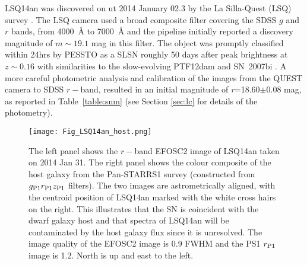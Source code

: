 \documentclass[useAMS,usenatbib]{mn2e}
\def\an{LSQ14an}
\begin{document}
\an\/ was discovered on {\sc ut} 2014 January 02.3 by the La Silla-Quest (LSQ) survey 
\citep{2013PASP..125..683B}. 
The LSQ camera used a broad composite filter covering the SDSS $g$ and $r$ bands,  from 4000~\AA\/ to 7000~\AA\/ and the pipeline initially reported a discovery 
magnitude of  $m\sim 19.1$ mag in this filter. The object was promptly classified within 24hrs by PESSTO as a SLSN roughly 50 days after peak brightness at $z\sim0.16$ with similarities to the slow-evolving PTF12dam and SN~2007bi \citep{atel}.  A more careful photometric analysis and calibration of the images from the QUEST camera to SDSS $r-$band, resulted in an initial magnitude of {\it r}=18.60$\pm$0.08 mag, as reported in Table~\ref{table:snm} (see Section \ref{sec:lc} for details of the photometry). 

\begin{figure}
\texttt{[image: Fig\_LSQ14an\_host.png]}
\caption{The left panel shows the $r-$band EFOSC2 image of LSQ14an taken on 2014 Jan 31.
The right panel shows the colour composite of the host galaxy from the Pan-STARRS1 survey (constructed
from $g_{\rm P1}r_{\rm P1}z_{\rm P1}$ filters). The two images are astrometrically
aligned, with the centroid position of LSQ14an marked with the white cross
hairs on the right. This illustrates that the SN is coincident with the dwarf
galaxy host and that spectra of LSQ14an will be contaminated by the host galaxy
flux since it is unresolved. The image quality of the EFOSC2 image is 0.9\arcsec\/ FWHM and the PS1 $r_{\rm P1}$ image is 1.2\arcsec.
North is up and east to the left.}
\label{fig:host}
\end{figure}
\end{document}
